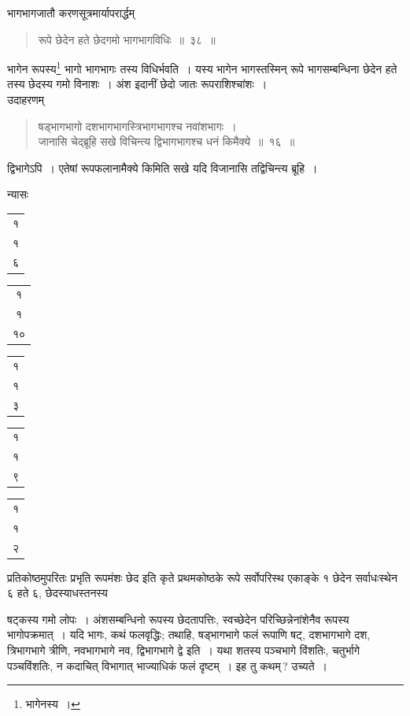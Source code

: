 \documentclass[10pt, openany]{book}
\begin{document}
{भागभागजातौ करणसूत्रमार्यापरार्द्धम्\textemdash}

 \label{38}
\begin{quote}
    
{\bs रूपे छेदेन हते छेदगमो भागभागविधिः~॥~३८~॥}\end{quote}

{भागेन रूपस्य\renewcommand{\thefootnote}{\s ४}\footnote{\s भागेनस्य~।}  भागो भागभागः तस्य विधिर्भवति~। यस्य भागेन
भागस्तस्मिन्}
{रूपे भागसम्बन्धिना छेदेन हते तस्य छेदस्य गमो विनाशः~। अंश इदानीं छेदो
जातः}
{रूपराशिश्चांशः~।}\\

{उदाहरणम्\textemdash}

\begin{quote}
    
{\eg षड्भागभागो दशभागभागस्त्रिभागभागश्च नवांशभागः~। \\
जानासि चेद्ब्रूहि सखे विचिन्त्य द्विभागभागश्च धनं किमैक्ये~॥~१६~॥}\end{quote} 


\newpage

{द्विभागेऽपि~। एतेषां रूपफलानामैक्ये किमिति सखे यदि विजानासि
तद्विचिन्त्य ब्रूहि~।}\\

{न्यासः\textendash \,\begin{tabular}{c|}१\\१\\६\end{tabular}\begin{tabular}{c|} १\\१\\१०\end{tabular}\begin{tabular}{c|} १\\१\\ ३\end{tabular}\begin{tabular}{c|} १\\१\\९\end{tabular}\begin{tabular}{c|} १\\१\\ २\end{tabular}
प्रतिकोष्ठमुपरितः प्रभृति रूपमंशः छेद इति कृते प्रथमकोष्ठके रूपे सर्वोपरिस्थ एकाङ्के १ छेदेन सर्वाधःस्थेन ६ हते ६,
छेदस्याधस्तनस्य}
{षट्कस्य गमो लोपः~। अंशसम्बन्धिनो रूपस्य छेदतापत्तिः, स्वच्छेदेन
परिच्छिन्नेनांशेनैव रूपस्य}
{भागोपक्रमात्~। यदि भागः, कथं फलवृद्धिः; तथाहि, षड्भागभागे फलं
रूपाणि षट्,}
{दशभागभागे दश, त्रिभागभागे त्रीणि, नवभागभागे नव, द्विभागभागे द्वे इति~।
यथा शतस्य}
{पञ्चभागे विंशतिः, चतुर्भागे पञ्चविंशतिः, न कदाचित् विभागात् भाज्याधिकं
फलं दृष्टम्~।}
{इह तु कथम्\,? उच्यते~।}
\end{document}
